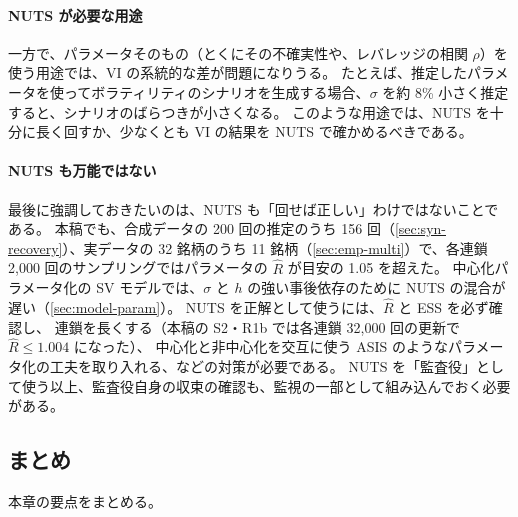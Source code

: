 \paragraph{NUTS が必要な用途}
一方で、パラメータそのもの（とくにその不確実性や、レバレッジの相関 $\rho$）を使う用途では、VI の系統的な差が問題になりうる。
たとえば、推定したパラメータを使ってボラティリティのシナリオを生成する場合、$\sigma$ を約 8\% 小さく推定すると、シナリオのばらつきが小さくなる。
このような用途では、NUTS を十分に長く回すか、少なくとも VI の結果を NUTS で確かめるべきである。

\paragraph{NUTS も万能ではない}
最後に強調しておきたいのは、NUTS も「回せば正しい」わけではないことである。
本稿でも、合成データの 200 回の推定のうち 156 回（\cref{sec:syn-recovery}）、実データの 32 銘柄のうち 11 銘柄（\cref{sec:emp-multi}）で、各連鎖 2,000 回のサンプリングではパラメータの $\hat R$ が目安の 1.05 を超えた。
中心化パラメータ化の SV モデルでは、$\sigma$ と $h$ の強い事後依存のために NUTS の混合が遅い（\cref{sec:model-param}）。
NUTS を正解として使うには、$\hat R$ と ESS を必ず確認し、
連鎖を長くする（本稿の S2・R1b では各連鎖 32,000 回の更新で $\hat R \le 1.004$ になった）、
中心化と非中心化を交互に使う ASIS \parencite{kastner2014}のようなパラメータ化の工夫を取り入れる、などの対策が必要である。
NUTS を「監査役」として使う以上、監査役自身の収束の確認も、監視の一部として組み込んでおく必要がある。

\subsection{まとめ}\label{sec:sys-summary}

本章の要点をまとめる。


